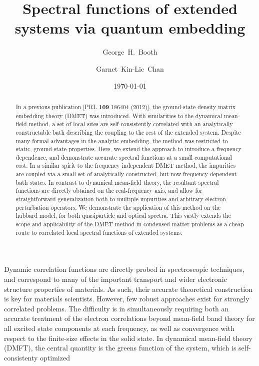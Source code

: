 \documentclass[aps,showpacs,twocolumn,nobibnotes]{revtex4}
\begin{document}
\title{Spectral functions of extended systems via quantum embedding}
\author{George~H.~Booth}
\author{Garnet~Kin-Lic~Chan}  

\begin{abstract}
In a previous publication [PRL {\bf 109} 186404 (2012)], the ground-state density matrix embedding theory (DMET) was introduced. With similarities 
to the dynamical mean-field method, a set of local sites are self-consistently correlated with an analytically constructable bath describing the
coupling to the rest of the extended system. 
Despite many formal advantages in the analytic embedding, the method was restricted to static, ground-state properties.
Here, we extend the approach to introduce a frequency dependence, and demonstrate accurate spectral functions at a small 
computational cost. In a similar spirit to the frequency independent DMET method, the impurities are coupled via a small set of 
analytically constructed, but now frequency-dependent bath states. In contrast to dynamical mean-field theory, the resultant 
spectral functions are directly obtained on the real-frequency axis, and allow for straightforward generalization both 
to multiple impurities and arbitrary electron perturbation operators. We demonstrate
the application of this method on the hubbard model, for both quasiparticle and optical spectra. This vastly extends the scope and applicability 
of the DMET method in condensed matter problems as a cheap route to correlated local spectral functions of extended systems.
\end{abstract}
\date{\today}
\maketitle

Dynamic correlation functions are directly probed in spectroscopic techniques, and correspond to many of the important transport and 
wider electronic structure properties of materials. As such, their accurate theoretical construction is key for materials scientists. 
However, few robust approaches exist for strongly correlated problems. The difficulty is in simultaneously requiring both an accurate 
treatment of the electron correlations beyond mean-field band theory for all excited state components at each frequency, as well as 
convergence with respect to the finite-size effects in the solid state. In dynamical mean-field theory (DMFT), the central quantity 
is the greens function of the system, which is self-consistenty optimized 
\end{document}
